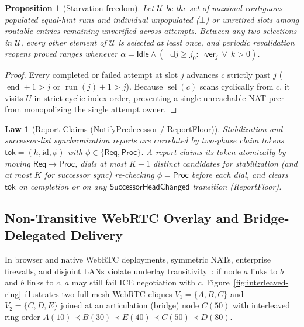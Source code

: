 \documentclass[journal]{IEEEtran}
\newtheorem{proposition}{Proposition}
\newtheorem{law}{Law}
\DeclareRobustCommand{\code}[1]{{\ttfamily\renewcommand{\_}{\textunderscore\allowbreak}#1}}
\begin{document}
\begin{proposition}[Starvation freedom]\label{prop:starve}
Let $\mathcal{U}$ be the set of maximal contiguous populated equal-hint runs and individual unpopulated ($\bot$) or unretired slots among routable entries remaining unverified across attempts.  Between any two selections in $\mathcal{U}$, every other element of $\mathcal{U}$ is selected at least once, and periodic revalidation reopens proved ranges whenever $\alpha=\mathsf{Idle}\land(\neg\exists j\ge j_0:\neg\mathsf{ver}_j\ \lor\ k>0)$.
\end{proposition}
\begin{proof}
Every completed or failed attempt at slot $j$ advances $c$ strictly past $j$
($\operatorname{end}+1>j$ or $\operatorname{run}(j)+1>j$).  Because
$\operatorname{sel}(c)$ scans cyclically from $c$, it visits $U$ in strict
cyclic index order, preventing a single unreachable NAT peer from monopolizing
the single attempt owner.
\end{proof}

\begin{law}[Report Claims (\code{NotifyPredecessor} / \code{ReportFloor})]\label{law:report-claims}
Stabilization and successor-list synchronization reports are correlated by
two-phase claim tokens $\mathsf{tok}=(h,\mathrm{id},\phi)$ with
$\phi\in\{\mathsf{Req},\mathsf{Proc}\}$.  A report claims its token atomically
by moving $\mathsf{Req}\to\mathsf{Proc}$, dials at most $K+1$ distinct
candidates for stabilization (and at most $K$ for successor sync) re-checking
$\phi=\mathsf{Proc}$ before each dial, and clears $\mathsf{tok}$ on completion
or on any $\mathsf{SuccessorHeadChanged}$ transition (\code{ReportFloor}).
\end{law}

\subsection{Non-Transitive WebRTC Overlay and Bridge-Delegated Delivery}\label{sec:non-transitive}

In browser and native WebRTC deployments, symmetric NATs, enterprise firewalls,
and disjoint LANs violate underlay transitivity~\cite{Freedman2005,Ford2006}:
if node $a$ links to $b$ and $b$ links to $c$, $a$ may still fail ICE
negotiation with $c$.  Figure~\ref{fig:interleaved-ring} illustrates two
full-mesh WebRTC cliques $V_1=\{A,B,C\}$ and $V_2=\{C,D,E\}$ joined at an
articulation (bridge) node $C(50)$ with interleaved ring order
$A(10)\prec B(30)\prec E(40)\prec C(50)\prec D(80)$.
\end{document}
